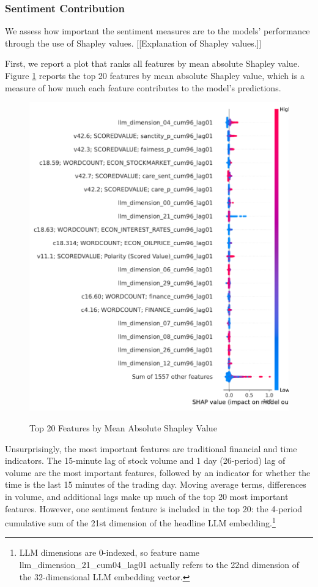 \documentclass[12pt]{article}
\begin{document}
\subsubsection{Sentiment Contribution}
We assess how important the sentiment measures are to the models' performance through the use of Shapley values. [[Explanation of Shapley values.]]

First, we report a plot that ranks all features by mean absolute Shapley value. Figure \ref{fig:shapley_overall} reports the top 20 features by mean absolute Shapley value, which is a measure of how much each feature contributes to the model's predictions.
\begin{figure}[H]
    \centering
    \caption{Top 20 Features by Mean Absolute Shapley Value}
    \includegraphics[width=0.75\linewidth]{../Output/shap_beeswarm_all.pdf}
    \label{fig:shapley_overall}
\end{figure}

Unsurprisingly, the most important features are traditional financial and time indicators. The 15-minute lag of stock volume and 1 day (26-period) lag of volume are the most important features, followed by an indicator for whether the time is the last 15 minutes of the trading day. Moving average terms, differences in volume, and additional lags make up much of the top 20 most important features. However, one sentiment feature is included in the top 20: the 4-period cumulative sum of the 21st dimension of the headline LLM embedding.\footnote{LLM dimensions are 0-indexed, so feature name llm\_dimension\_21\_cum04\_lag01 actually refers to the 22nd dimension of the 32-dimensional LLM embedding vector.}
\end{document}
